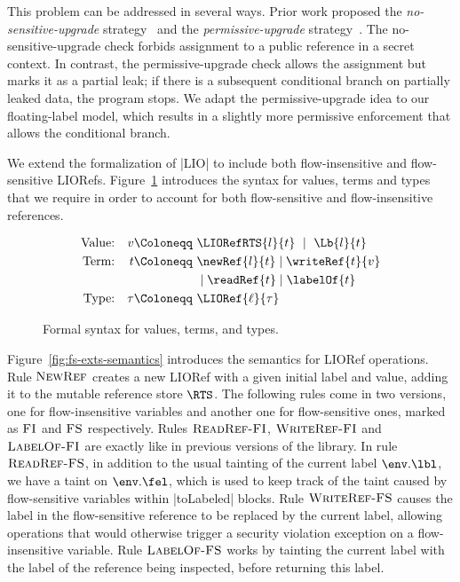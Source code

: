 This problem can be addressed in several ways. Prior work proposed the
\emph{no-sensitive-upgrade} strategy~\citep{?} and the
\emph{permissive-upgrade} strategy~\citep{?}. The no-sensitive-upgrade
check forbids assignment to a public reference in a secret context. In
contrast, the permissive-upgrade check allows the assignment but marks
it as a partial leak; if there is a subsequent conditional branch on
partially leaked data, the program stops. We adapt the
permissive-upgrade idea to our floating-label model, which results in
a slightly more permissive enforcement that allows the conditional
branch.



We extend the formalization of |LIO| to include both flow-insensitive
and flow-sensitive LIORefs. Figure~\ref{fig:fs-exts-syntax} introduces
the syntax for values, terms and types that we require in order to
account for both flow-sensitive and flow-insensitive references.

\begin{figure}[!ht] %
\vspace*{-5pt}
\begin{align*}
\textrm{Value:}   && v    \Coloneqq~ &
                                 \LIORefRTS{l}{t}
                           \ \mid\  \Lb{l}{t} \\
\textrm{Term:}    && t    \Coloneqq~ &
                             \newRef{l}{t}
                           \mid  \writeRef{t}{v} \\
                  && &     \mid  \readRef{t}
                           \mid  \labelOf{t} \\
\textrm{Type:}    && \tau \Coloneqq~& 
                          \LIORef{\ell}{\tau} \\
\end{align*}
\caption{Formal syntax for values, terms, and types.\label{fig:fs-exts-syntax}}
\vspace*{-5pt}
\end{figure} 

Figure~\ref{fig:fs-exts-semantics} introduces the semantics for LIORef
operations. Rule $\textsc{NewRef}$ creates a new LIORef with a given
initial label and value, adding it to the mutable reference store
$\RTS$. The following rules come in two versions, one for
flow-insensitive variables and another one for flow-sensitive ones,
marked as $\textsc{FI}$ and $\textsc{FS}$ respectively. Rules
$\textsc{ReadRef-FI}$, $\textsc{WriteRef-FI}$ and
$\textsc{LabelOf-FI}$ are exactly like in previous versions of the
library. In rule $\textsc{ReadRef-FS}$, in addition to the usual
tainting of the current label $\env.\lbl$, we have a taint on
$\env.\fel$, which is used to keep track of the taint caused by
flow-sensitive variables within |toLabeled| blocks. Rule
$\textsc{WriteRef-FS}$ causes the label in the flow-sensitive
reference to be replaced by the current label, allowing operations
that would otherwise trigger a security violation exception on a
flow-insensitive variable. Rule $\textsc{LabelOf-FS}$ works by
tainting the current label with the label of the reference being
inspected, before returning this label.


